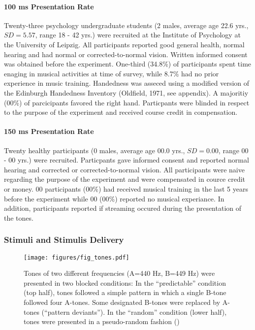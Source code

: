 \documentclass[stu,a4paper,12pt, nofontenc, babel, american]{apa7}
\begin{document}
\hypertarget{ms-presentation-rate}{%
\paragraph{100 ms Presentation Rate}\label{ms-presentation-rate}}

Twenty-three psychology undergraduate students (2 males, average age
22.6 yrs., \(SD=5.57\), range 18 - 42 yrs.) were recruited at the
Institute of Psychology at the University of Leipzig. All participants
reported good general health, normal hearing and had normal or
corrected-to-normal vision. Written informed consent was obtained before
the experiment. One-third (34.8\%) of participants spent time enaging in
musical activities at time of survey, while 8.7\% had no prior
experience in music training. Handedness was asseced using a modified
version of the Edinburgh Handedness Inventory (Oldfield, 1971, see
appendix). A majoritiy (00\%) of parcicipants favored the right hand.
Particpants were blinded in respect to the purpose of the experiment and
received course credit in compensation.

\hypertarget{ms-presentation-rate-1}{%
\paragraph{150 ms Presentation Rate}\label{ms-presentation-rate-1}}

Twenty healthy participants (0 males, average age 00.0 yrs.,
\(SD=0.00\), range 00 - 00 yrs.) were recruited. Particpants gave
informed consent and reported normal hearing and corrected or
corrected-to-normal vision. All participants were naive regarding the
purpose of the experiment and were compensated in cource credit or
money. 00 participants (00\%) had received musical training in the last
5 years before the experiment while 00 (00\%) reported no musical
experiance. In addition, participants reported if streaming occured
during the presentation of the tones.

\hypertarget{stimuli-and-stimulis-delivery}{%
\subsubsection{Stimuli and Stimulis
Delivery}\label{stimuli-and-stimulis-delivery}}

\begin{figure}
\centering
\texttt{[image: figures/fig\_tones.pdf]}
\caption{Tones of two different frequencies (A=440 Hz, B=449 Hz) were
presented in two blocked conditions: In the \enquote{predictable}
condition (top half), tones followed a simple pattern in which a single
B-tone followed four A-tones. Some designated B-tones were replaced by
A-tones (\enquote{pattern deviants}). In the \enquote{random} condition
(lower half), tones were presented in a pseudo-random fashion ()}
\end{figure}
\end{document}
